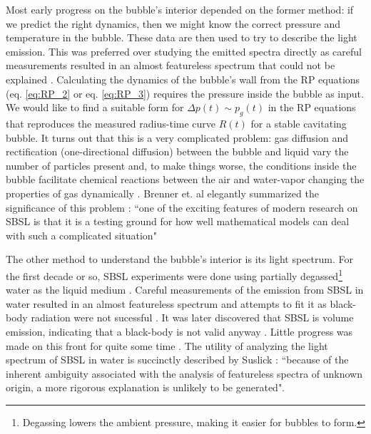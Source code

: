 \documentclass[prb,aps,nofootinbib,superscriptaddress,floatfix]{revtex4-2}
\begin{document}
Most early progress on the bubble's interior depended on the former method: if we predict the right dynamics, then we might know the correct pressure and temperature in the bubble. These data are then used to try to describe the light emission. This was preferred over studying the emitted spectra directly as careful measurements resulted in an almost featureless spectrum that could not be explained \cite{hiller1992spectrum}. Calculating the dynamics of the bubble's wall from the RP equations (eq. \ref{eq:RP_2} or eq. \ref{eq:RP_3}) requires the pressure inside the bubble as input. We would like to find a suitable form for $\Delta p(t) \sim p_g(t)$ in the RP equations that reproduces the measured radius-time curve $R(t)$ for a stable cavitating bubble. It turns out that this is a very complicated problem: gas diffusion and rectification (one-directional diffusion) between the bubble and liquid vary the number of particles present and, to make things worse, the conditions inside the bubble facilitate chemical reactions between the air and water-vapor changing the properties of gas dynamically \cite{brenner2002single}. Brenner et. al elegantly summarized the significance of this problem \cite{brenner2002single}: ``one of the exciting features of modern research on SBSL is that it is a testing ground for how well mathematical models can deal with such a complicated situation"

The other method to understand the bubble's interior is its light spectrum. For the first decade or so, SBSL experiments were done using partially degassed\footnote{Degassing lowers the ambient pressure, making it easier for bubbles to form.} water as the liquid medium \cite{suslick2008inside,brenner2002single,gaitan1992sonoluminescence}. Careful measurements of the emission from SBSL in water resulted in an almost featureless spectrum and attempts to fit it as black-body radiation were not sucessful \cite{hiller1992spectrum}. It was later discovered that SBSL is volume emission, indicating that a black-body is not valid anyway \cite{hilgenfeldt1999simple,hilgenfeldt1999sonoluminescence}. Little progress was made on this front for quite some time \cite{brenner2002single}. The utility of analyzing the light spectrum of SBSL in water is succinctly described by Suslick \cite{suslick2008inside}: ``because of the inherent ambiguity associated with the analysis of featureless spectra of unknown origin, a more rigorous explanation is unlikely to be generated". 
\end{document}
